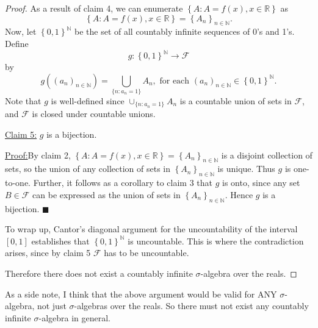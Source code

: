 \documentclass[12pt]{article}
\newenvironment{claimproof}[1]{\par\noindent\underline{Proof:}\space#1}{\hfill $\blacksquare$}
\begin{document}
\begin{proof}
As a result of claim 4, we can enumerate $\left\{ A : A = f(x), x \in \mathbb{R} \right\}$ as 
\[ \left\{ A : A = f(x), x \in \mathbb{R} \right\} = \left\{ A_{n} \right\}_{n\in\mathbb{N}}. \]
Now, let $\left\{ 0,1 \right\}^{\mathbb{N}}$ be the set of all countably infinite sequences of 0's and 1's. Define 
\[ g: \left\{ 0,1 \right\}^{\mathbb{N}} \longrightarrow \mathcal{F} \]
by 
\[ g\left( \left( a_{n} \right)_{n\in\mathbb{N}} \right) = \bigcup_{\{n : a_{n} = 1\}}A_{n}, \text{ for each } \left( a_{n} \right)_{n\in\mathbb{N}}
\in \left\{ 0,1 \right\}^{\mathbb{N}}. \]
Note that $g$ is well-defined since $\cup_{\{n:a_{n}=1\}}A_{n}$ is a countable union of sets in $\mathcal{F}$, and $\mathcal{F}$ is closed under
countable unions.

\underline{Claim 5:} $g$ is a bijection.

\begin{claimproof}
By claim 2, $\left\{ A : A = f(x), x \in \mathbb{R} \right\} = \left\{ A_{n} \right\}_{n\in\mathbb{N}}$ is a disjoint collection of sets, so the union
of any collection of sets in $\left\{ A_{n} \right\}_{n\in\mathbb{N}}$ is unique. Thus $g$ is one-to-one. Further, it follows as a corollary to claim
3 that $g$ is onto, since any set $B \in \mathcal{F}$ can be expressed as the union of sets in $\left\{ A_{n} \right\}_{n\in\mathbb{N}}$. Hence $g$ is a bijection.
\end{claimproof}

To wrap up, Cantor's diagonal argument for the uncountability of the interval $[0,1]$ establishes that $\left\{ 0,1 \right\}^{\mathbb{N}}$ is uncountable.
This is where the contradiction arises, since by claim 5 $\mathcal{F}$ has to be uncountable.

Therefore there does not exist a countably infinite $\sigma$-algebra over the reals.
\end{proof}

As a side note, I think that the above argument would be valid for ANY $\sigma$-algebra, not just $\sigma$-algebras over the reals. So there must not
exist any countably infinite $\sigma$-algebra in general.
\end{document}
